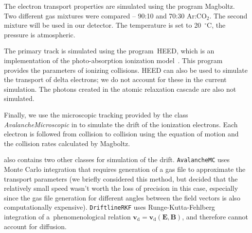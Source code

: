 		The electron transport properties are simulated using the program Magboltz. Two different gas mixtures were compared -- 90:10 and 70:30 Ar:CO$_2$. The second mixture will be used in our detector. The temperature is set to 20~$^\circ$C, the pressure is atmospheric.
		
		The primary track is simulated using the program~\ac{HEED}, which is an implementation of the photo-absorption ionization model~\cite{HEED}. This program provides the parameters of ionizing collisions. \ac{HEED} can also be used to simulate the transport of delta electrons; we do not account for these in the current simulation. The photons created in the atomic relaxation cascade are also not simulated.
		
		Finally, we use the microscopic tracking provided by the class \textit{AvalancheMicroscopic} in \garfieldpp to simulate the drift of the ionization electrons. Each electron is followed from collision to collision using the equation of motion and the collision rates calculated by Magboltz.
		
		\garfieldpp also contains two other classes for simulation of the drift. \texttt{AvalancheMC} uses Monte Carlo integration that requires generation of a gas file to approximate the transport parameters (we briefly considered this method, but decided that the relatively small speed wasn't worth the loss of precision in this case, especially since the gas file generation for different angles between the field vectors is also computationally expensive). \texttt{DriftlineRKF} uses Runge-Kutta-Fehlberg integration of a~phenomenological relation $\mathbf{v}_\text{d} = \mathbf{v}_\text{d}(\mathbf{E},\mathbf{B})$, and therefore cannot account for diffusion.
		
